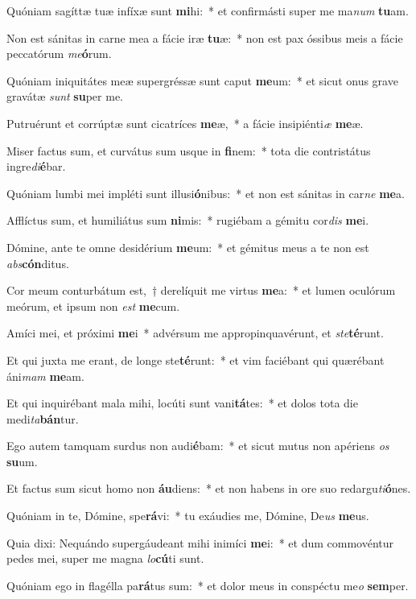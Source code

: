 \item Quóniam sagíttæ tuæ infíxæ sunt \textbf{mi}hi:~* et confirmásti super me ma\textit{num} \textbf{tu}am.
\item Non est sánitas in carne mea a fácie iræ \textbf{tu}æ:~* non est pax óssibus meis a fácie peccatórum \textit{me}\textbf{ó}rum.
\item Quóniam iniquitátes meæ supergréssæ sunt caput \textbf{me}um:~* et sicut onus grave gravátæ \textit{sunt} \textbf{su}per me.
\item Putruérunt et corrúptæ sunt cicatríces \textbf{me}æ,~* a fácie insipiénti\textit{æ} \textbf{me}æ.
\item Miser factus sum, et curvátus sum usque in \textbf{fi}nem:~* tota die contristátus ingre\textit{di}\textbf{é}bar.
\item Quóniam lumbi mei impléti sunt illusi\textbf{ó}nibus:~* et non est sánitas in car\textit{ne} \textbf{me}a.
\item Afflíctus sum, et humiliátus sum \textbf{ni}mis:~* rugiébam a gémitu cor\textit{dis} \textbf{me}i.
\item Dómine, ante te omne desidérium \textbf{me}um:~* et gémitus meus a te non est \textit{abs}\textbf{cón}ditus.
\item Cor meum conturbátum est,~† derelíquit me virtus \textbf{me}a:~* et lumen oculórum meórum, et ipsum non \textit{est} \textbf{me}cum.
\item Amíci mei, et próximi \textbf{me}i~* advérsum me appropinquavérunt, et \textit{ste}\textbf{té}runt.
\item Et qui juxta me erant, de longe ste\textbf{té}runt:~* et vim faciébant qui quærébant áni\textit{mam} \textbf{me}am.
\item Et qui inquirébant mala mihi, locúti sunt vani\textbf{tá}tes:~* et dolos tota die medi\textit{ta}\textbf{bán}tur.
\item Ego autem tamquam surdus non audi\textbf{é}bam:~* et sicut mutus non apériens \textit{os} \textbf{su}um.
\item Et factus sum sicut homo non \textbf{áu}diens:~* et non habens in ore suo redargu\textit{ti}\textbf{ó}nes.
\item Quóniam in te, Dómine, spe\textbf{rá}vi:~* tu exáudies me, Dómine, De\textit{us} \textbf{me}us.
\item Quia dixi: Nequándo supergáudeant mihi inimíci \textbf{me}i:~* et dum commovéntur pedes mei, super me magna \textit{lo}\textbf{cú}ti sunt.
\item Quóniam ego in flagélla pa\textbf{rá}tus sum:~* et dolor meus in conspéctu me\textit{o} \textbf{sem}per.
